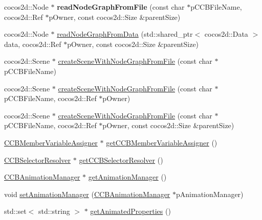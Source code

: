 \begin{DoxyCompactItemize}
\item 
\mbox{\label{classcocosbuilder_1_1CCBReader_a26d992f27d4cdf423211c897c835e06f}} 
cocos2d\+::\+Node $\ast$ {\bfseries read\+Node\+Graph\+From\+File} (const char $\ast$p\+C\+C\+B\+File\+Name, cocos2d\+::\+Ref $\ast$p\+Owner, const cocos2d\+::\+Size \&parent\+Size)
\item 
cocos2d\+::\+Node $\ast$ \hyperlink{classcocosbuilder_1_1CCBReader_afcc34580625ae0cecaf2c00a5607df89}{read\+Node\+Graph\+From\+Data} (std\+::shared\+\_\+ptr$<$ cocos2d\+::\+Data $>$ data, cocos2d\+::\+Ref $\ast$p\+Owner, const cocos2d\+::\+Size \&parent\+Size)
\item 
cocos2d\+::\+Scene $\ast$ \hyperlink{classcocosbuilder_1_1CCBReader_a44a0287bfb6e8f138ae941045a70c5d0}{create\+Scene\+With\+Node\+Graph\+From\+File} (const char $\ast$p\+C\+C\+B\+File\+Name)
\item 
cocos2d\+::\+Scene $\ast$ \hyperlink{classcocosbuilder_1_1CCBReader_a618dab5055325f1639359a78b315b372}{create\+Scene\+With\+Node\+Graph\+From\+File} (const char $\ast$p\+C\+C\+B\+File\+Name, cocos2d\+::\+Ref $\ast$p\+Owner)
\item 
cocos2d\+::\+Scene $\ast$ \hyperlink{classcocosbuilder_1_1CCBReader_a68fe74e233137eb272352fadd05c5fb0}{create\+Scene\+With\+Node\+Graph\+From\+File} (const char $\ast$p\+C\+C\+B\+File\+Name, cocos2d\+::\+Ref $\ast$p\+Owner, const cocos2d\+::\+Size \&parent\+Size)
\item 
\hyperlink{classcocosbuilder_1_1CCBMemberVariableAssigner}{C\+C\+B\+Member\+Variable\+Assigner} $\ast$ \hyperlink{classcocosbuilder_1_1CCBReader_acd5ad23324caf174dd4a8c3a298b6f43}{get\+C\+C\+B\+Member\+Variable\+Assigner} ()
\item 
\hyperlink{classcocosbuilder_1_1CCBSelectorResolver}{C\+C\+B\+Selector\+Resolver} $\ast$ \hyperlink{classcocosbuilder_1_1CCBReader_abef44f57e452c615a3f0d44511862564}{get\+C\+C\+B\+Selector\+Resolver} ()
\item 
\hyperlink{classcocosbuilder_1_1CCBAnimationManager}{C\+C\+B\+Animation\+Manager} $\ast$ \hyperlink{classcocosbuilder_1_1CCBReader_a3692ac7081dd6bfaa5c2414318f3ca19}{get\+Animation\+Manager} ()
\item 
void \hyperlink{classcocosbuilder_1_1CCBReader_ac942b72ca6dd452c87f97525c1c16844}{set\+Animation\+Manager} (\hyperlink{classcocosbuilder_1_1CCBAnimationManager}{C\+C\+B\+Animation\+Manager} $\ast$p\+Animation\+Manager)
\item 
std\+::set$<$ std\+::string $>$ $\ast$ \hyperlink{classcocosbuilder_1_1CCBReader_a8a5c5a338b4bc06d735536e735f46219}{get\+Animated\+Properties} ()

\end{DoxyCompactItemize}
